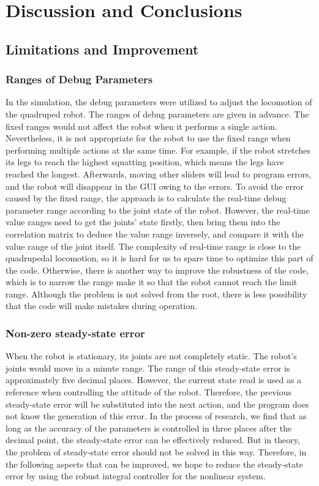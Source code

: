 \chapter{Discussion and Conclusions}


\section{Limitations and Improvement}
\subsection{Ranges of Debug Parameters}
In the simulation, the debug parameters were utilized to adjust the locomotion of the quadruped robot. The ranges of debug parameters are given in advance. The fixed ranges would not affect the robot when it performs a single action. Nevertheless, it is not appropriate for the robot to use the fixed range when performing multiple actions at the same time. For example, if the robot stretches its legs to reach the highest squatting position, which means the legs have reached the longest. Afterwards, moving other sliders will lead to program errors, and the robot will disappear in the GUI\cite{ref:GUI} owing to the errors. 
To avoid the error caused by the fixed range, the approach is to calculate the real-time debug parameter range according to the joint state of the robot. However, the real-time value ranges need to get the joints' state firstly, then bring them into the correlation matrix to deduce the value range inversely, and compare it with the value range of the joint itself. The complexity of real-time range is close to the quadrupedal locomotion, so it is hard for us to spare time to optimize this part of the code. Otherwise, there is another way to improve the robustness of the code, which is to narrow the range make it so that the robot cannot reach the limit range. Although the problem is not solved from the root, there is less possibility that the code will make mistakes during operation.

\subsection{Non-zero steady-state error}
When the robot is stationary, its joints are not completely static. The robot's joints would move in a minute range. The range of this steady-state error is approximately five decimal places. However, the current state read is used as a reference when controlling the attitude of the robot. Therefore, the previous steady-state error will be substituted into the next action, and the program does not know the generation of this error. In the process of research, we find that as long as the accuracy of the parameters is controlled in three places after the decimal point, the steady-state error can be effectively reduced. But in theory, the problem of steady-state error should not be solved in this way. Therefore, in the following aspects that can be improved, we hope to reduce the steady-state error by using the robust integral controller\cite{ref:RNIcontrol} for the nonlinear system.


